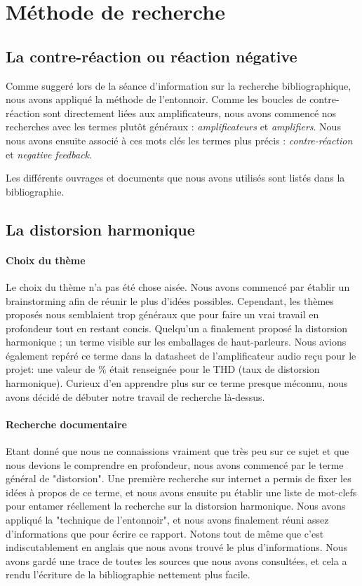 

\section{Méthode de recherche}

\subsection{La contre-réaction ou réaction négative}
Comme suggeré lors de la séance d'information sur la recherche bibliographique,
nous avons appliqué la méthode de l'entonnoir. Comme les boucles de contre-réaction 
sont directement liées aux amplificateurs, nous avons commencé nos recherches avec 
les termes plutôt généraux : \textit{amplificateurs} et \textit{amplifiers}. Nous 
nous avons ensuite associé à ces mots clés les termes plus précis : \textit{contre-réaction}
et \textit{negative feedback}.

Les différents ouvrages et documents que nous avons utilisés sont listés dans la bibliographie.

\subsection{La distorsion harmonique}

\paragraph{Choix du thème}
Le choix du thème n'a pas été chose aisée. Nous avons commencé par établir un brainstorming afin de réunir 
le plus d'idées possibles. Cependant, les thèmes proposés nous semblaient trop généraux que pour faire un vrai 
travail en profondeur tout en restant concis. Quelqu'un a finalement proposé la distorsion harmonique ; un 
terme visible sur les emballages de haut-parleurs. Nous avions également repéré ce terme dans la datasheet 
de l'amplificateur audio reçu pour le projet: une valeur de \% était renseignée pour le THD 
(taux de distorsion harmonique). Curieux d'en apprendre plus sur ce terme presque méconnu, 
nous avons décidé de débuter notre travail de recherche là-dessus.

\paragraph{Recherche documentaire}
Etant donné que nous ne connaissions vraiment que très peu sur ce sujet et que nous 
devions le comprendre en profondeur, nous avons commencé par le terme général de "distorsion".
Une première recherche sur internet a permis de fixer les idées à propos de ce terme, et nous 
avons ensuite pu établir une liste de mot-clefs pour entamer réellement la recherche sur la 
distorsion harmonique. Nous avons appliqué la "technique de l'entonnoir", et nous avons finalement 
réuni assez d'informations que pour écrire ce rapport. Notons tout de même que c'est indiscutablement
en anglais que nous avons 
trouvé le plus d'informations. Nous avons gardé une trace de toutes les sources que nous avons 
consultées, et cela a rendu l'écriture de la bibliographie nettement plus facile.


